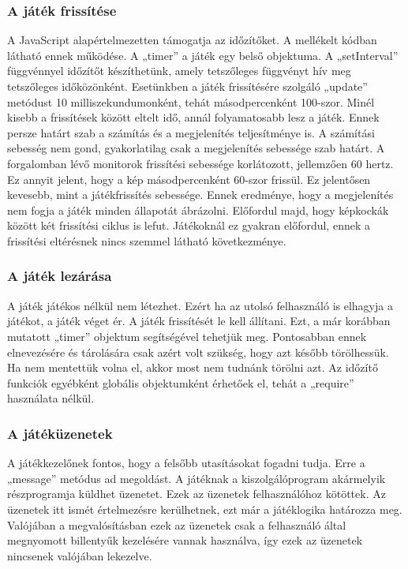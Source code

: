 \documentclass[bibliography=totocnumbered]{article}
\begin{document}
\subsubsection{A játék
frissítése}

A JavaScript alapértelmezetten támogatja az időzítőket. A mellékelt kódban
látható ennek működése. A „timer'' a játék egy belső objektuma. A
„setInterval'' függvénnyel időzítőt készíthetünk, amely tetszőleges
függvényt hív meg tetszőleges időközönként. Esetünkben a játék
frissítésére szolgáló „update'' metódust 10 milliszekundumonként, tehát
másodpercenként 100-szor. Minél kisebb a frissítések között eltelt idő,
annál folyamatosabb lesz a játék. Ennek persze határt szab a számítás és
a megjelenítés teljesítménye is. A számítási sebesség nem gond,
gyakorlatilag csak a megjelenítés sebessége szab határt. A forgalomban
lévő monitorok frissítési sebessége korlátozott, jellemzően 60 hertz. Ez
annyit jelent, hogy a kép másodpercenként 60-szor frissül. Ez jelentősen
kevesebb, mint a játékfrissítés sebessége. Ennek eredménye, hogy a
megjelenítés nem fogja a játék minden állapotát ábrázolni. Előfordul
majd, hogy képkockák között két frissítési ciklus is lefut. Játékoknál
ez gyakran előfordul, ennek a frissítési eltérésnek nincs szemmel
látható következménye.


\subsubsection{A játék lezárása}

A játék játékos nélkül nem létezhet. Ezért ha az utolsó felhasználó is
elhagyja a játékot, a játék véget ér. A játék frissítését le kell
állítani. Ezt, a már korábban mutatott „timer'' objektum segítségével
tehetjük meg. Pontosabban ennek elnevezésére és tárolására csak azért
volt szükség, hogy azt később törölhessük. Ha nem mentettük volna el,
akkor most nem tudnánk törölni azt. Az időzítő funkciók egyébként
globális objektumként érhetőek el, tehát a „require'' használata nélkül.


\subsubsection{A játéküzenetek}

A játékkezelőnek fontos, hogy a felsőbb utasításokat fogadni tudja. Erre
a „message'' metódus ad megoldást. A játéknak a kiszolgálóprogram
akármelyik részprogramja küldhet üzenetet. Ezek az üzenetek
felhasználóhoz kötöttek. Az üzenetek itt ismét értelmezésre kerülhetnek,
ezt már a játéklogika határozza meg. Valójában a megvalósításban ezek az
üzenetek csak a felhasználó által megnyomott billentyűk kezelésére
vannak használva, így ezek az üzenetek nincsenek valójában lekezelve.
\end{document}
